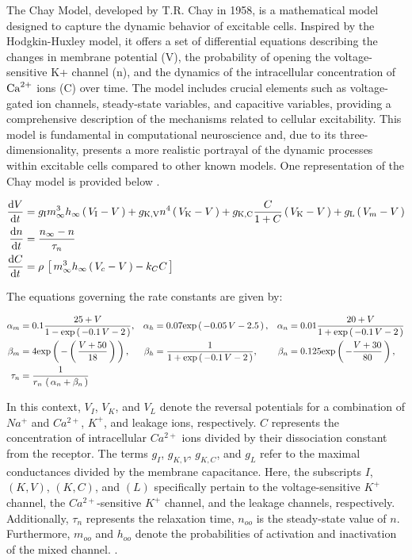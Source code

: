 \documentclass[../Orator]{subfiles}
\begin{document}
The Chay Model, developed by T.R. Chay in 1958, is a mathematical model designed to capture the dynamic behavior of excitable cells. Inspired by the Hodgkin-Huxley model, it offers a set of differential equations describing the changes in membrane potential (V), the probability of opening the voltage-sensitive K+ channel (n), and the dynamics of the intracellular concentration of \(\mathrm{Ca}^{2+}\) ions (C) over time. The model includes crucial elements such as voltage-gated ion channels, steady-state variables, and capacitive variables, providing a comprehensive description of the mechanisms related to cellular excitability. This model is fundamental in computational neuroscience and, due to its three-dimensionality, presents a more realistic portrayal of the dynamic processes within excitable cells compared to other known models. One representation of the Chay model is provided below \cite{}.

\begin{align}
    \frac{\mathrm{d}\displaystyle V}{\mathrm{d}\displaystyle t} &= g_\mathrm{I}  m^3_\infty h_\infty \left(\,V_\mathrm{I} - V\,\right) + g_\mathrm{K, V} n^4 \left(\,V_\mathrm{K} - V\,\right) + g_\mathrm{K, C}  \frac{C}{1+C}\left(\,V_\mathrm{K} - V\,\right) + g_\mathrm{L} \left(\,V_m - V\,\right) \\
    \frac{\mathrm{d}\displaystyle n}{\mathrm{d}\displaystyle t} &= \frac{n_\infty - n}{\tau_n} \\
    \frac{\mathrm{d}\displaystyle C}{\mathrm{d}\displaystyle t} &= \rho \, \left[\,m^3_\infty h_\infty \left(\,V_c - V\,\right) - k_C C\,\right]
\end{align}

The equations governing the rate constants are given by:

\begin{align*}
    \alpha_m &= 0.1 \frac{25 + V}{1 - \mathrm{exp}\left(\,-0.1 \, V - 2\,\right)}, &
    \alpha_h &=  0.07 \mathrm{exp}\left(\,-0.05\,V -2.5\,\right), &
    \alpha_n &= 0.01 \frac{20 + V}{1 + \mathrm{exp}\left(\,-0.1 \, V - 2\,\right)} \\
    \beta_m  &= 4 \mathrm{exp}\left(\,-\left(\,\frac{ V + 50 }{ 18 } \,\right) \,\right), &
    \beta_h  &= \frac{ 1 }{ 1 + \mathrm{exp}\left(\,-0.1 \, V - 2\,\right)}, &
    \beta_n  &= 0.125 \mathrm{exp}\left(\,- \frac{V + 30}{80}\,\right), \\
    \tau_n &= \frac{1}{ r_n \, \left(\,\alpha_n + \beta_n\,\right) }
\end{align*}

In this context, $V_I$, $V_K$, and $V_L$ denote the reversal potentials for a combination of $Na^+$ and $Ca^{2+}$, $K^+$, and leakage ions, respectively. $C$ represents the concentration of intracellular $Ca^{2+}$ ions divided by their dissociation constant from the receptor. The terms $g_I$, $g_{K,V}$, $g_{K,C}$, and $g_L$ refer to the maximal conductances divided by the membrane capacitance. Here, the subscripts $I$, $(K,V)$, $(K,C)$, and $(L)$ specifically pertain to the voltage-sensitive $K^+$ channel, the $Ca^{2+}$-sensitive $K^+$ channel, and the leakage channels, respectively. Additionally, $\tau_n$ represents the relaxation time, $n_{oo}$ is the steady-state value of $n$. Furthermore, $m_{oo}$ and $h_{oo}$ denote the probabilities of activation and inactivation of the mixed channel. \cite{}.
\end{document}
